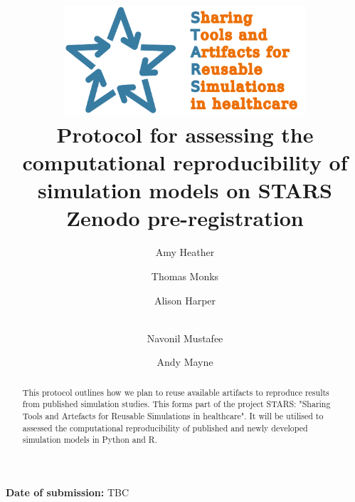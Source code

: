 \title{
    \includegraphics[width=9cm]{images/stars_pointy_v2_text2.png}\\[1cm]
    \textbf{Protocol for assessing the computational reproducibility of simulation models on STARS} \\
    \large Zenodo pre-registration
}

\author[1]{ Amy Heather}
\author[1]{ Thomas Monks}
\author[2]{ Alison Harper}
\author[2]{\\  Navonil Mustafee}
\author[3]{ Andy Mayne}


\date{}

\maketitle

\textbf{Date of submission:} TBC

\vspace{0.5cm}

\begin{shaded}
    \begin{abstract}
        This protocol outlines how we plan to reuse available artifacts to reproduce results from published simulation studies. This forms part of the project STARS: "Sharing Tools and Artefacts for Reusable Simulations in healthcare". It will be utilised to assessed the computational reproducibility of published and newly developed simulation models in Python and R.
    \end{abstract}
\end{shaded}

\vspace{0.5cm}

\newpage
\tableofcontents